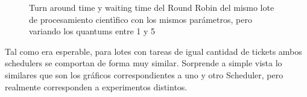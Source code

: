 \begin{figure}
\hfill
{}
\hfill
{}
\hfill
\caption{Turn around time y waiting time del Round Robin del mismo lote de procesamiento cientìfico con los mismos parámetros,
	pero variando los quantums entre 1 y 5}
\end{figure}

Tal como era esperable, para lotes con tareas de igual cantidad de tickets ambos schedulers se comportan de forma muy similar.
Sorprende a simple vista lo similares que son los gráficos correspondientes a uno y otro Scheduler, pero realmente corresponden a experimentos distintos.




